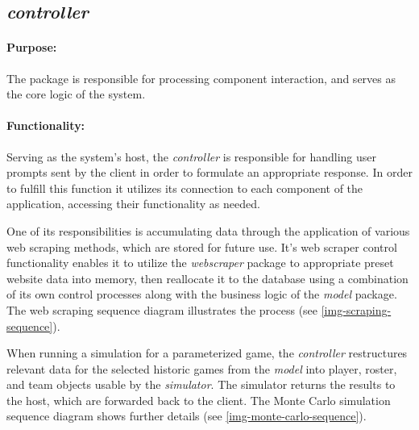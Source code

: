 \documentclass{thesis-ekf}
\theoremstyle{definition}
\theoremstyle{remark}
\begin{document}
\subsection{\emph{controller}}
\paragraph{Purpose:}
The package is responsible for processing component interaction, and serves as the core logic of the system.
\paragraph{Functionality:}
Serving as the system's host, the \emph{controller} is responsible for handling user prompts sent by the client in order to formulate an appropriate response. In order to fulfill this function it utilizes its connection to each component of the application, accessing their functionality as needed.

One of its responsibilities is accumulating data through the application of various web scraping methods, which are stored for future use. It's web scraper control functionality enables it to utilize the \emph{webscraper} package to appropriate preset website data into memory, then reallocate it to the database using a combination of its own control processes along with the business logic of the \emph{model} package. The web scraping sequence diagram illustrates the process (see {\ref{img-scraping-sequence}}).

When running a simulation for a parameterized game, the \emph{controller} restructures relevant data for the selected historic games from the \emph{model} into player, roster, and team objects usable by the \emph{simulator}. The simulator returns the results to the host, which are forwarded back to the client. The Monte Carlo simulation sequence diagram shows further details (see {\ref{img-monte-carlo-sequence}}).
\end{document}
